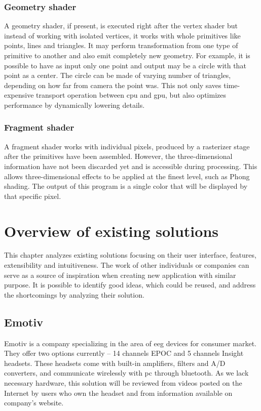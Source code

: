 \subsection{Geometry shader}
A geometry shader, if present, is executed right after the vertex shader but instead
of working with isolated vertices, it works with whole primitives like points,
lines and triangles. It may perform transformation from one type of primitive to
another and also emit completely new geometry. For example, it is possible to
have as input only one point and output may be a circle with that point as a
center. The circle can be made of varying number of triangles, depending on how far from camera
the point was. This not only saves time-expensive transport operation between
\gls{cpu} and \gls{gpu}, but also optimizes performance by dynamically lowering details.

\subsection{Fragment shader}
A fragment shader works with individual pixels, produced by a rasterizer stage after the
primitives have been assembled. However, the three-dimensional information have
not been discarded yet and is accessible during processing. This allows
three-dimensional effects to be applied at the finest level, such as Phong shading. The output
of this program is a single color that will be displayed by that specific pixel.

\chapter{Overview of existing solutions}
\label{existSol}
This chapter analyzes existing solutions focusing on their user interface, features, extensibility and intuitiveness. The work of other individuals or companies can serve as a source of inspiration when creating new application with similar purpose. It is possible to identify good ideas, which could be reused, and address the shortcomings by analyzing their solution.  

\section{Emotiv}
Emotiv is a company specializing in the area of \gls{eeg} devices for consumer market.
They offer two options currently -- 14 channels EPOC and 5 channels Insight
headsets. These headsets come with built-in amplifiers, filters and A/D
converters, and communicate wirelessly with \gls{pc} through bluetooth. As
we lack necessary hardware, this solution will be reviewed from videos posted on
the Internet by users who own the headset and from information available on
company's website.

